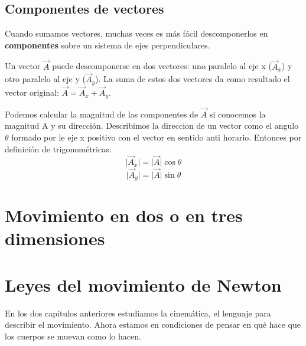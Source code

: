 \documentclass{article}
\newcommand{\newsection}[1]{
    \vspace{0.5cm}
    {\color{sectionColor}
    \centering
    \section{\bl{#1}}}
    \color{black}
    \vspace{0.5cm}
}
\newcommand{\newsubsection}[1]{
    \vspace{0.5cm}
    \color{sectionColor}
    \subsection{ #1}
    \color{black}
    \vspace{0.5cm}
}
\newcommand{\bl}[1]{\textbf{#1}}
\begin{document}

    \newsubsection{Componentes de vectores}

    \par Cuando sumamos vectores, muchas veces es más fácil descomponerlos en \bl{componentes} sobre un sistema de ejes perpendiculares.
    \par Un vector \(\vec{A}\) puede descomponerse en dos vectores: uno paralelo al eje x (\(\vec{A}_x\)) y otro paralelo al eje y (\(\vec{A}_y\)). La suma de estos dos vectores da como resultado el vector original: \(\vec{A}=\vec{A}_x+\vec{A}_y\).

    \begin{figure}[H]
        \centering
        \shorthandoff{>}
        \shorthandon{>}
    \end{figure}

    \par Podemos calcular la magnitud de las componentes de $\vec{A}$ si conocemos la magnitud A y su dirección. Describimos la direccion de un vector como el angulo $\theta$ formado por le eje x positivo con el vector en sentido anti horario. Entonces por definición de trigonométricas:
    \[ \lvert \vec{A}_x \rvert = \lvert \vec{A} \rvert \cos \theta \]
    \[ \lvert \vec{A}_y \rvert = \lvert \vec{A} \rvert \sin \theta \]

\newsection{Movimiento en dos o en tres dimensiones}


\newsection{Leyes del movimiento de Newton}

\par En los dos capítulos anteriores estudiamos la cinemática, el lenguaje para describir el movimiento. Ahora estamos en condiciones de pensar en qué hace que los cuerpos se muevan como lo hacen.
\end{document}
